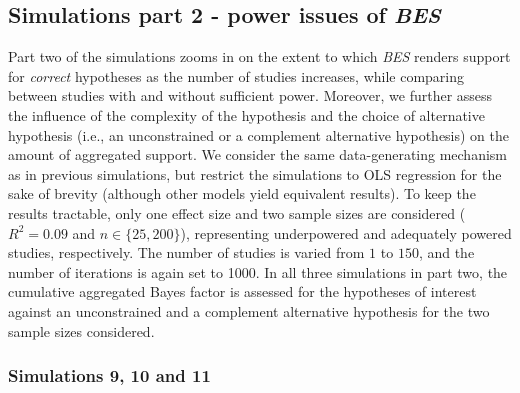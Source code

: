 \documentclass[
]{interact}
\begin{document}
                    \hypertarget{simulations-part-2---power-issues-of-bes}{%
                      \subsection{\texorpdfstring{Simulations part 2 - power issues of
                        \emph{BES}}{Simulations part 2 - power issues of BES}}\label{simulations-part-2---power-issues-of-bes}}
                    
                    Part two of the simulations zooms in on the extent to which \emph{BES}
                    renders support for \emph{correct} hypotheses as the number of studies
                    increases, while comparing between studies with and without sufficient
                    power. Moreover, we further assess the influence of the complexity of
                    the hypothesis and the choice of alternative hypothesis (i.e., an
                                                                             unconstrained or a complement alternative hypothesis) on the amount of
                    aggregated support. We consider the same data-generating mechanism as in
                    previous simulations, but restrict the simulations to OLS regression for
                    the sake of brevity (although other models yield equivalent results). To
                    keep the results tractable, only one effect size and two sample sizes
                    are considered (\(R^2 = 0.09\) and \(n \in \{25, 200\}\)), representing
                    underpowered and adequately powered studies, respectively. The number of
                    studies is varied from \(1\) to \(150\), and the number of iterations is
                    again set to 1000. In all three simulations in part two, the cumulative
                    aggregated Bayes factor is assessed for the hypotheses of interest
                    against an unconstrained and a complement alternative hypothesis for the
                    two sample sizes considered.
                    
                    \hypertarget{simulations-9-10-and-11}{%
                      \subsubsection{Simulations 9, 10 and 11}\label{simulations-9-10-and-11}}
                    
\end{document}
